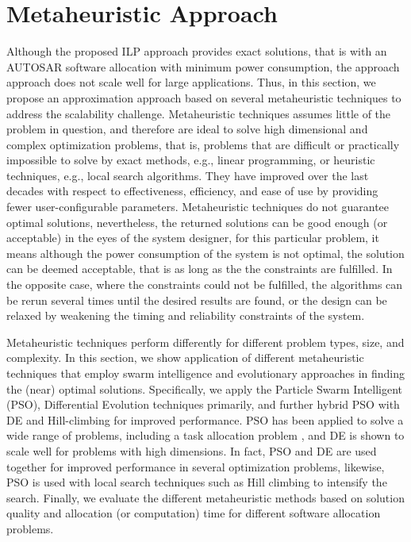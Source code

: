 \section{Metaheuristic Approach}
Although the proposed ILP approach provides exact solutions, that is with an AUTOSAR software allocation with minimum power consumption, the approach approach does not scale well for large applications. Thus, in this section, we propose an approximation approach based on several metaheuristic techniques to address the scalability challenge. Metaheuristic techniques assumes little of the problem in question, and therefore are ideal to solve high dimensional and complex optimization problems, that is, problems that are difficult or practically impossible to solve by exact methods, e.g., linear programming, or heuristic techniques, e.g., local search algorithms. They have improved over the last decades with respect to effectiveness, efficiency, and ease of use by providing fewer user-configurable parameters. Metaheuristic techniques do not guarantee optimal solutions, nevertheless, the returned solutions can be good enough (or acceptable) in the eyes of the system designer, for this particular problem, it means although the power consumption of the system is not optimal, the solution can be deemed acceptable, that is as long as the the constraints are fulfilled. In the opposite case, where the constraints could not be fulfilled, the algorithms can be rerun several times until the desired results are found, or the design can be relaxed by weakening the timing and reliability constraints of the system.

Metaheuristic techniques perform differently for different problem types, size, and complexity. In this section, we show application of different metaheuristic techniques that employ swarm intelligence and evolutionary approaches in finding the (near) optimal solutions. Specifically, we apply the Particle Swarm Intelligent (PSO), Differential Evolution techniques primarily, and further hybrid PSO with DE and Hill-climbing for improved performance. PSO has been applied to solve a wide range of problems, including a task allocation problem \cite{yin2007task}, and DE is shown to scale well for problems with high dimensions. In fact, PSO and DE are used together for improved performance in several optimization problems, likewise, PSO is used with local search techniques such as Hill climbing to intensify the search. Finally, we evaluate the different metaheuristic methods based on solution quality and allocation (or computation) time for different software allocation problems.


